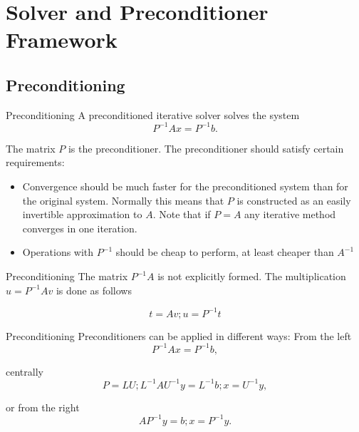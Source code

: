 \section{Solver and Preconditioner Framework}

\subsection{Preconditioning}
\begin{frame}{Preconditioning}
  A preconditioned iterative solver solves the system
  \begin{equation}
    P^{-1} A x = P^{-1}b .
  \end{equation}

The matrix $P$ is  the preconditioner.
The preconditioner should satisfy certain requirements:
\begin{itemize}
\item Convergence should be much faster for the preconditioned
system than for the original system. Normally this means
that $P$ is constructed as an easily invertible approximation
to $A$. Note that if $P = A$ any iterative method converges in
one iteration.
\item Operations with $P^{-1}$ should be cheap to perform, at least
  cheaper than $A^{-1}$

\end{itemize}
\end{frame}

\begin{frame}{Preconditioning}
  The matrix $P^{-1}A$ is not explicitly formed. The
multiplication $u = P^{-1}Av$ is done as follows

\begin{equation*}
t = Av; u = P^{-1}t
\end{equation*}

\end{frame}

\begin{frame}{Preconditioning}
  Preconditioners can be applied in different ways:
  From the left
  \begin{equation*}
    P^{-1}Ax = P^{-1}b ,
  \end{equation*}

  centrally
  \begin{equation*}
P = LU; L^{-1}AU^{-1}y = L^{-1}b; x = U^{-1}y ,
  \end{equation*}

  or from the right
  \begin{equation*}
    AP^{-1}y = b; x = P^{-1}y .
  \end{equation*}

\end{frame}


